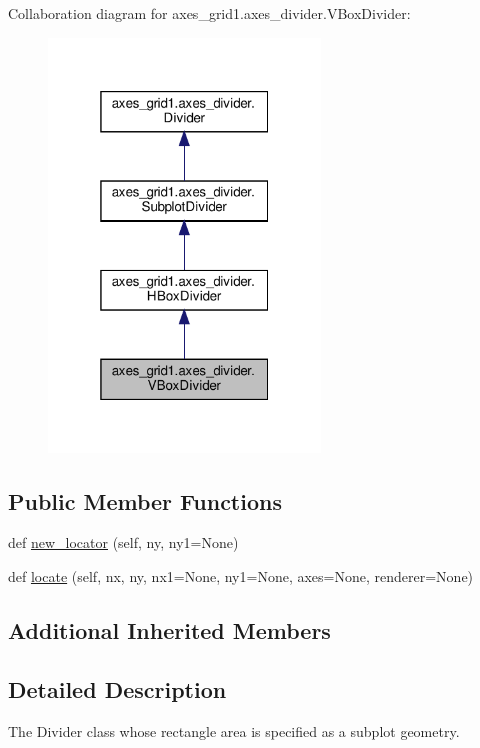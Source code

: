 Collaboration diagram for axes\+\_\+grid1.\+axes\+\_\+divider.\+V\+Box\+Divider\+:
\nopagebreak
\begin{figure}[H]
\begin{center}
\leavevmode
\includegraphics[width=205pt]{classaxes__grid1_1_1axes__divider_1_1VBoxDivider__coll__graph}
\end{center}
\end{figure}
\subsection*{Public Member Functions}
\begin{DoxyCompactItemize}
\item 
def \hyperlink{classaxes__grid1_1_1axes__divider_1_1VBoxDivider_a0c5b79d180078a44c42c6446531e61a7}{new\+\_\+locator} (self, ny, ny1=None)
\item 
def \hyperlink{classaxes__grid1_1_1axes__divider_1_1VBoxDivider_ae4db7b2c903e7be30d24d6e2c729dea2}{locate} (self, nx, ny, nx1=None, ny1=None, axes=None, renderer=None)
\end{DoxyCompactItemize}
\subsection*{Additional Inherited Members}


\subsection{Detailed Description}
\begin{DoxyVerb}The Divider class whose rectangle area is specified as a subplot geometry.
\end{DoxyVerb}
 

